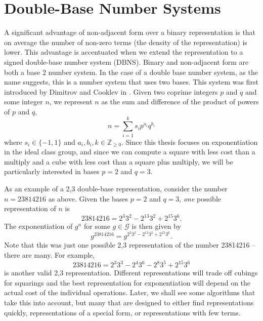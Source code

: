 \documentclass{ucalgthes1}
\theoremstyle{plain}
\theoremstyle{definition}
\newcommand{\ZZgez}{\mathbb{Z}_{\ge 0}}
\begin{document}
\bigbreak
\section{Double-Base Number Systems}\label{section:dbns}

A significant advantage of non-adjacent form over a binary representation is that on average the number of non-zero terms (the density of the representation) is lower.  This advantage is accentuated when we extend the representation to a signed double-base number system (DBNS).  Binary and non-adjacent form are both a base 2 number system.  In the case of a double base number system, as the name suggests, this is a number system that uses two bases.  This system was first introduced by Dimitrov and Cooklev in \cite{Dimitrov1995}.  Given two coprime integers $p$ and $q$ and some integer $n$, we represent $n$ as the sum and difference of the product of powers of $p$ and $q$,
\begin{equation}\label{eq:generalDbnsForm}
	n = \sum_{i=1}^k s_i p^{a_i} q^{b_i}
\end{equation}
where $s_i \in \{-1, 1\}$ and $a_i, b_i, k \in \ZZgez$.  Since this thesis focuses on exponentiation in the ideal class group, and since we can compute a square with less cost than a multiply and a cube with less cost than a square plus multiply, we will be particularly interested in bases $p=2$ and $q=3$.

As an example of a 2,3 double-base representation, consider the number $n=23814216$ as above.  Given the bases $p=2$ and $q=3$, \emph{one} possible representation of $n$ is
\begin{equation}\label{eq:chainedEg}
	23814216 = 2^3 3^2 -2^{13} 3^2 +2^{15} 3^6.
\end{equation}
The exponentiation of $g^n$ for some $g \in \mathcal G$ is then given by
\[
	g^{23814216} = g^{2^3 3^2 -2^{13} 3^2 +2^{15} 3^6}.
\]
Note that this was just one possible 2,3 representation of the number 23814216 -- there are many.  For example,
\begin{equation}\label{eq:unchainedEg}
	23814216 = 2^3 3^3 - 2^4 3^6 - 2^8 3^5 + 2^{15} 3^6
\end{equation}
is another valid 2,3 representation.  Different representations will trade off cubings for squarings and the best representation for exponentiation will depend on the actual cost of the individual operations.  Later, we shall see some algorithms that take this into account, but many that are designed to either find representations quickly, representations of a special form, or representations with few terms.
\end{document}
